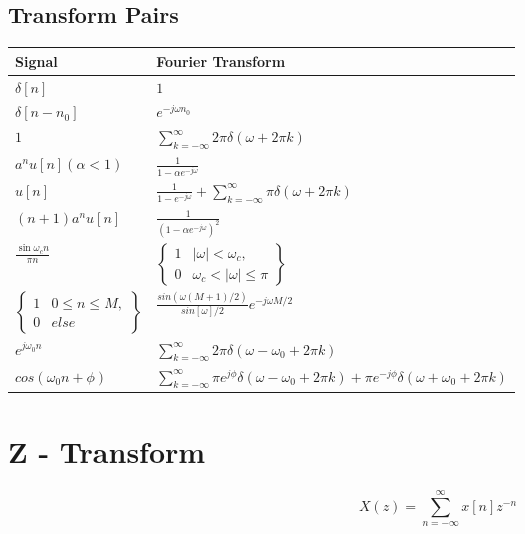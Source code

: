 \documentclass{article}
\begin{document}
\subsection*{Transform Pairs}
\begin{center}
    \begin{tabularx}{\textwidth}{XX}
        \hline
        Signal & Fourier Transform\\
        \hline
        $\delta[n]$ & $1$\\
        $\delta[n-n_0]$ & $e^{-j\omega n_0}$\\
        $1$ & $\sum_{k=-\infty}^{\infty}{2\pi \delta(\omega+2\pi k)}$\\
        $a^nu[n] (\alpha < 1)$ & $\frac{1}{1-\alpha e^{-j\omega}}$\\
        $u[n]$ & $\frac{1}{1 - e^{-j\omega}}+\sum_{k=-\infty}^{\infty}{\pi \delta(\omega+2\pi k)}$\\
        $(n+1)a^nu[n]$ & $\frac{1}{(1-\alpha e^{-j\omega})^2}$\\
        $\frac{\sin \omega_c n}{\pi n}$ & $\left\{
            \begin{array}{cc}
                1 & |\omega|<\omega_c,\\
                0 & \omega_c < |\omega| \le \pi 
            \end{array}
            \right\}$\\
        $\left\{
            \begin{array}{cc}
                1 & 0\le n \le M,\\
                0 & else 
            \end{array}
            \right\}$ & $\frac{sin(\omega(M+1)/2)}{sin[\omega]/2}e^{-j\omega M/2}$\\
        $e^{j\omega_0 n}$ & $\sum_{k=-\infty}^{\infty}{2\pi \delta(\omega - \omega_0+2\pi k)}$\\
        $cos(\omega_0 n+\phi)$ & $\sum_{k=-\infty}^{\infty}{\pi e^{j\phi}\delta(\omega - \omega_0+2\pi k)+\pi e^{-j\phi}\delta(\omega + \omega_0+2\pi k)}$
    \end{tabularx}
\end{center}
\pagebreak
\section*{Z - Transform}
$$X(z) = \sum_{n=-\infty}^{\infty}{x[n]z^{-n}}$$
\end{document}
